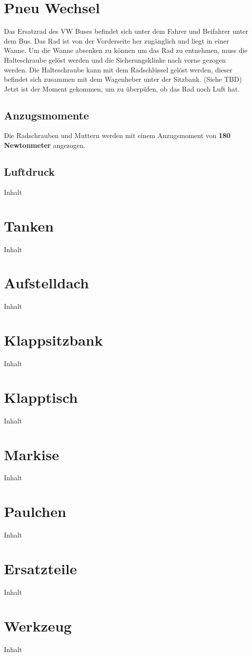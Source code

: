 \section{Pneu Wechsel}
Das Ersatzrad des VW Buses befindet sich unter dem Fahrer und Beifahrer unter dem Bus. 
Das Rad ist von der Vorderseite her zugänglich und liegt in einer Wanne.
Um die Wanne absenken zu können um das Rad zu entnehmen, muss die Halteschraube gelöst werden und die Sicherungsklinke nach vorne gezogen werden. 
Die Halteschraube kann mit dem Radschlüssel gelöst werden, dieser befindet sich zusammen mit dem Wagenheber unter der Sitzbank. (Siehe TBD)
Jetzt ist der Moment gekommen, um zu überpüfen, ob das Rad noch Luft hat.

\subsection{Anzugsmomente}
Die Radschrauben und Muttern werden mit einem Anzugsmoment von \textbf{180 Newtonmeter} angezogen.
\subsection{Luftdruck}
Inhalt
\section{Tanken}
Inhalt
\section{Aufstelldach}
Inhalt
\section{Klappsitzbank}
Inhalt
\section{Klapptisch}
Inhalt
\section{Markise}
Inhalt
\section{Paulchen}
Inhalt
\section{Ersatzteile}
Inhalt
\section{Werkzeug}
Inhalt
